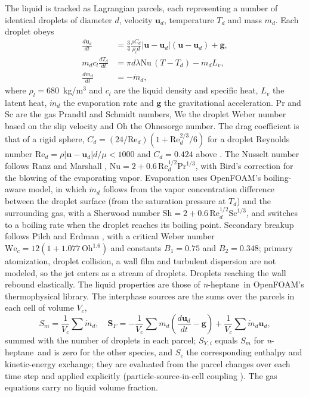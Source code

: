 \documentclass[aip,pof,preprint,amsmath,amssymb]{revtex4-2}
\newcommand{\nh}{\textit{n}-heptane}
\begin{document}
The liquid is tracked as Lagrangian parcels, each representing a number of identical droplets of diameter $d$, velocity $\mathbf{u}_d$, temperature $T_d$ and mass $m_d$. Each droplet obeys
\begin{align}
\frac{d\mathbf{u}_d}{dt} &= \frac{3}{4}\frac{\rho C_d}{\rho_l d}|\mathbf{u} - \mathbf{u}_d|(\mathbf{u} - \mathbf{u}_d) + \mathbf{g}, \\
m_d c_l \frac{dT_d}{dt} &= \pi d \lambda \mathrm{Nu}\,(T - T_d) - \dot m_d L_v, \\
\frac{dm_d}{dt} &= -\dot m_d,
\end{align}
where $\rho_l = 680$~kg/m$^3$ and $c_l$ are the liquid density and specific heat, $L_v$ the latent heat, $\dot m_d$ the evaporation rate and $\mathbf{g}$ the gravitational acceleration. Pr and Sc are the gas Prandtl and Schmidt numbers, We the droplet Weber number based on the slip velocity and Oh the Ohnesorge number. The drag coefficient is that of a rigid sphere, $C_d = (24/\mathrm{Re}_d)(1 + \mathrm{Re}_d^{2/3}/6)$ for a droplet Reynolds number $\mathrm{Re}_d = \rho|\mathbf{u} - \mathbf{u}_d|d/\mu < 1000$ and $C_d = 0.424$ above \cite{Liu1993drag}. The Nusselt number follows Ranz and Marshall \cite{Ranz1952}, $\mathrm{Nu} = 2 + 0.6\,\mathrm{Re}_d^{1/2}\mathrm{Pr}^{1/3}$, with Bird's correction for the blowing of the evaporating vapor. Evaporation uses OpenFOAM's boiling-aware model, in which $\dot m_d$ follows from the vapor concentration difference between the droplet surface (from the saturation pressure at $T_d$) and the surrounding gas, with a Sherwood number $\mathrm{Sh} = 2 + 0.6\,\mathrm{Re}_d^{1/2}\mathrm{Sc}^{1/3}$, and switches to a boiling rate when the droplet reaches its boiling point. Secondary breakup follows Pilch and Erdman \cite{Pilch1987}, with a critical Weber number $\mathrm{We}_c = 12(1 + 1.077\,\mathrm{Oh}^{1.6})$ and constants $B_1 = 0.75$ and $B_2 = 0.348$; primary atomization, droplet collision, a wall film and turbulent dispersion are not modeled, so the jet enters as a stream of droplets. Droplets reaching the wall rebound elastically. The liquid properties are those of \nh\ in OpenFOAM's thermophysical library. The interphase sources are the sums over the parcels in each cell of volume $V_c$,
\begin{equation}
S_m = \frac{1}{V_c}\sum \dot m_d, \quad \mathbf{S}_F = -\frac{1}{V_c}\sum m_d\left(\frac{d\mathbf{u}_d}{dt} - \mathbf{g}\right) + \frac{1}{V_c}\sum \dot m_d\mathbf{u}_d,
\end{equation}
summed with the number of droplets in each parcel; $S_{Y,i}$ equals $S_m$ for \nh\ and is zero for the other species, and $S_e$ the corresponding enthalpy and kinetic-energy exchange; they are evaluated from the parcel changes over each time step and applied explicitly (particle-source-in-cell coupling \cite{Crowe1977}). The gas equations carry no liquid volume fraction.
\end{document}
